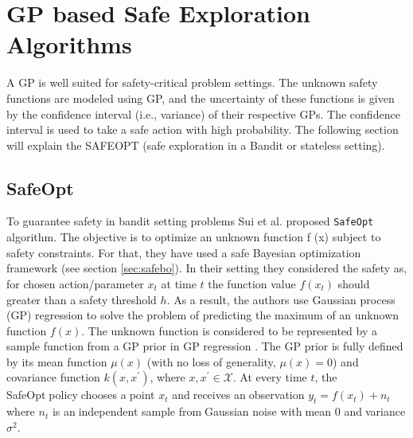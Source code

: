 \section{GP based Safe Exploration Algorithms}\label{sec:safe-explore}
A GP is well suited for safety-critical problem settings. The unknown safety functions are modeled using GP, and the uncertainty of these functions is given by the confidence interval (i.e., variance) of their respective GPs. The confidence interval is used to take a safe action with high probability. The following section will explain the SAFEOPT (safe exploration in a Bandit or stateless setting).

\subsection{SafeOpt}
To guarantee safety in bandit setting problems Sui et al.\cite{sui15} proposed \texttt{SafeOpt} algorithm. The objective is to optimize an unknown function f (x) subject to safety constraints.
For that, they have used a safe Bayesian optimization framework (see section \ref{sec:safebo}). 
In their setting they considered the safety as, for chosen action/parameter $x_t$ at time $t$ the function value $f(x_t)$ should greater than a safety threshold $h$. 
As a result, the authors use Gaussian process (GP) regression to solve the problem of predicting the maximum of an unknown function $f(x)$. 
The unknown function is considered to be represented by a sample function from a GP prior in GP regression \cite{RasmussenW06}.
The GP prior is fully defined by its mean function $\mu(x)$ (with no loss of generality, $\mu(x) = 0$) and covariance function $k(x, x^\prime )$, where $x, x^\prime \in \mathcal{X}$.
At every time $t$, the SafeOpt\textcolor{white}{i}policy\textcolor{white}{i}chooses a\textcolor{white}{i}point $x_t$ and\textcolor{white}{i}receives an\textcolor{white}{i}observation $y_t = f (x_t) + n_t$ where $n_t$ is an\textcolor{white}{i}independent sample from\textcolor{white}{i}Gaussian noise with\textcolor{white}{i}mean 0 and\textcolor{white}{i}variance $\sigma^2$. 
